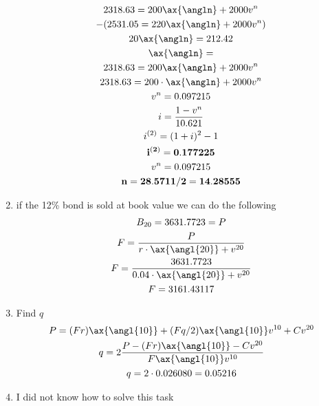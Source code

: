 \documentclass[a4paper, 12pt, reqno]{amsart}
\begin{document}
\begin{enumerate}
\begin{equation}
\begin{gathered}
                2318.63 = 200\ax{\angln} + 2000 v^n    \\
                -(2531.05 = 220\ax{\angln} + 2000 v^n)    \\
                20\ax{\angln} = 212.42  \\
                \ax{\angln} =     \\
                2318.63 = 200\ax{\angln} + 2000 v^n    \\
                2318.63 = 200\cdot \ax{\angln} + 2000 v^n    \\
                v^n = 0.097215      \\
                i = \frac{1-v^n}{10.621}    \\
                i^{(2)} = (1+i)^2 - 1   \\
                \mathbf{i^{(2)} = 0.177225}   \\
                v^n = 0.097215      \\
                \mathbf{n = 28.5711/2 = 14.28555}
            \end{gathered}
        \end{equation}
    \item if the 12\% bond is sold at book value we can do the following
        \begin{equation}\nonumber
            \begin{gathered}
                B_{20} = 3631.7723 = P  \\
                F = \frac{P}{r \cdot \ax{\angl{20}} + v^{20}} \\
                F = \frac{3631.7723}{0.04 \cdot \ax{\angl{20}} + v^{20}} \\
                F = 3161.43117
            \end{gathered}
        \end{equation}
    \item Find $q$
        \begin{equation}\nonumber
            \begin{gathered}
                P = (Fr)\ax{\angl{10}} + (Fq/2)\ax{\angl{10}} v^{10} + Cv^{20} \\
                q = 2\frac{P - (Fr)\ax{\angl{10}} - Cv^{20}}
                    {F\ax{\angl{10}} v^{10}}            \\
                q = 2 \cdot 0.026080 = 0.05216
            \end{gathered}
        \end{equation}
    \item I did not know how to solve this task
\end{enumerate}
\end{document}

